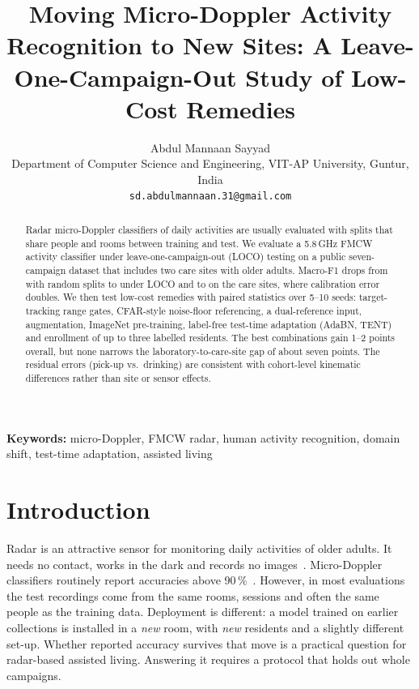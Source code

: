 \documentclass[11pt,a4paper]{article}
\begin{document}
\title{Moving Micro-Doppler Activity Recognition to New Sites: A Leave-One-Campaign-Out Study of Low-Cost Remedies}
\author{Abdul Mannaan Sayyad\\ \normalsize Department of Computer Science and Engineering, VIT-AP University, Guntur, India\\ \normalsize \texttt{sd.abdulmannaan.31@gmail.com}}
\date{}


\maketitle

\begin{abstract}
Radar micro-Doppler classifiers of daily activities are usually evaluated with splits that share people and rooms between training and test. We evaluate a 5.8\,GHz FMCW activity classifier under leave-one-campaign-out (LOCO) testing on a public seven-campaign dataset that includes two care sites with older adults. Macro-F1 drops from \PROTRAND{} with random splits to \PROTLOCO{} under LOCO and to \PROTCARE{} on the care sites, where calibration error doubles. We then test low-cost remedies with paired statistics over 5--10 seeds: target-tracking range gates, CFAR-style noise-floor referencing, a dual-reference input, augmentation, ImageNet pre-training, label-free test-time adaptation (AdaBN, TENT) and enrollment of up to three labelled residents. The best combinations gain 1--2 points overall, but none narrows the laboratory-to-care-site gap of about seven points. The residual errors (pick-up vs.\ drinking) are consistent with cohort-level kinematic differences rather than site or sensor effects.
\end{abstract}

\noindent\textbf{Keywords:} micro-Doppler, FMCW radar, human activity recognition, domain shift, test-time adaptation, assisted living

\section{Introduction}
Radar is an attractive sensor for monitoring daily activities of older adults. It needs no contact, works in the dark and records no images~\cite{fioranelli2019health,shah2019review}. Micro-Doppler classifiers routinely report accuracies above 90\,\%~\cite{gurbuz2019spm,li2019survey}. However, in most evaluations the test recordings come from the same rooms, sessions and often the same people as the training data. Deployment is different: a model trained on earlier collections is installed in a \emph{new} room, with \emph{new} residents and a slightly different set-up. Whether reported accuracy survives that move is a practical question for radar-based assisted living. Answering it requires a protocol that holds out whole campaigns.
\end{document}
